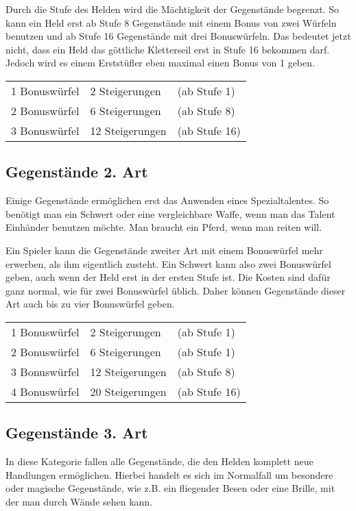 Durch die Stufe des Helden wird die Mächtigkeit der Gegenstände begrenzt. So kann ein Held erst ab Stufe 8 Gegenstände mit einem Bonus von zwei Würfeln benutzen und ab Stufe 16 Gegenstände mit drei Bonuswürfeln. Das bedeutet jetzt nicht, dass ein Held das göttliche Kletterseil erst in Stufe 16 bekommen darf. Jedoch wird es einem Erststüfler eben maximal einen Bonus von 1 geben.

\begin{tabular}[C]{lll}
  1 Bonuswürfel & 2 Steigerungen & (ab Stufe 1) \\
  2 Bonuswürfel & 6 Steigerungen & (ab Stufe 8) \\
  3 Bonuswürfel & 12 Steigerungen & (ab Stufe 16) \\
\end{tabular}

\subsection{Gegenstände 2. Art}
Einige Gegenstände ermöglichen erst das Anwenden eines Spezialtalentes. So benötigt man ein Schwert oder eine vergleichbare Waffe, wenn man das Talent Einhänder benutzen möchte. Man braucht ein Pferd, wenn man reiten will.

Ein Spieler kann die Gegenstände zweiter Art mit einem Bonuswürfel mehr erwerben, als ihm eigentlich zusteht. Ein Schwert kann also zwei Bonuswürfel geben, auch wenn der Held erst in der ersten Stufe ist. Die Kosten sind dafür ganz normal, wie für zwei Bonuswürfel üblich. Daher können Gegenstände dieser Art auch bis zu vier Bonuswürfel geben.

\begin{tabular}[C]{lll}
  1 Bonuswürfel & 2 Steigerungen & (ab Stufe 1) \\
  2 Bonuswürfel & 6 Steigerungen & (ab Stufe 1) \\
  3 Bonuswürfel & 12 Steigerungen & (ab Stufe 8) \\
  4 Bonuswürfel & 20 Steigerungen & (ab Stufe 16) \\
\end{tabular}

\subsection{Gegenstände 3. Art}
In diese Kategorie fallen alle Gegenstände, die den Helden komplett neue Handlungen ermöglichen. Hierbei handelt es sich im Normalfall um besondere oder magische Gegenstände, wie z.B. ein fliegender Besen oder eine Brille, mit der man durch Wände sehen kann.

